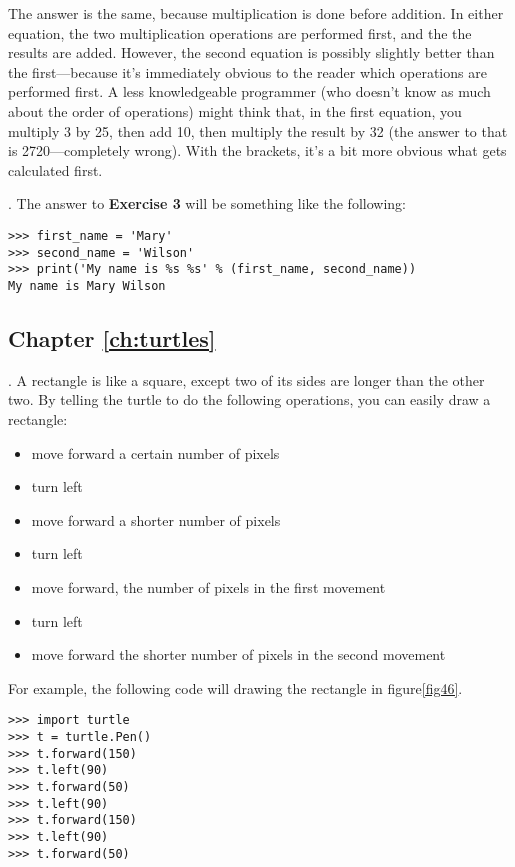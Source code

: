 \noindent
The answer is the same, because multiplication is done before addition.  In either equation, the two multiplication operations are performed first, and the the results are added.  However, the second equation is possibly slightly better than the first---because it's immediately obvious to the reader which operations are performed first.  A less knowledgeable programmer (who doesn't know as much about the order of operations) might think that, in the first equation, you multiply 3 by 25, then add 10, then multiply the result by 32 (the answer to that is 2720---completely wrong).  With the brackets, it's a bit more obvious what gets calculated first.

.  The answer to \textbf{Exercise 3} will be something like the following:

\begin{listing}
\begin{verbatim}
>>> first_name = 'Mary'
>>> second_name = 'Wilson'
>>> print('My name is %s %s' % (first_name, second_name))
My name is Mary Wilson
\end{verbatim}
\end{listing}

\subsection*{Chapter \ref{ch:turtles}}

. A rectangle is like a square, except two of its sides are longer than the other two.  By telling the turtle to do the following operations, you can easily draw a rectangle:

\begin{itemize}
 \item move forward a certain number of pixels
 \item turn left
 \item move forward a shorter number of pixels
 \item turn left
 \item move forward, the number of pixels in the first movement
 \item turn left
 \item move forward the shorter number of pixels in the second movement
\end{itemize}

\noindent
For example, the following code will drawing the rectangle in figure\ref{fig46}.

\begin{listing}
\begin{verbatim}
>>> import turtle
>>> t = turtle.Pen()
>>> t.forward(150)
>>> t.left(90)
>>> t.forward(50)
>>> t.left(90)
>>> t.forward(150)
>>> t.left(90)
>>> t.forward(50)
\end{verbatim}
\end{listing}

